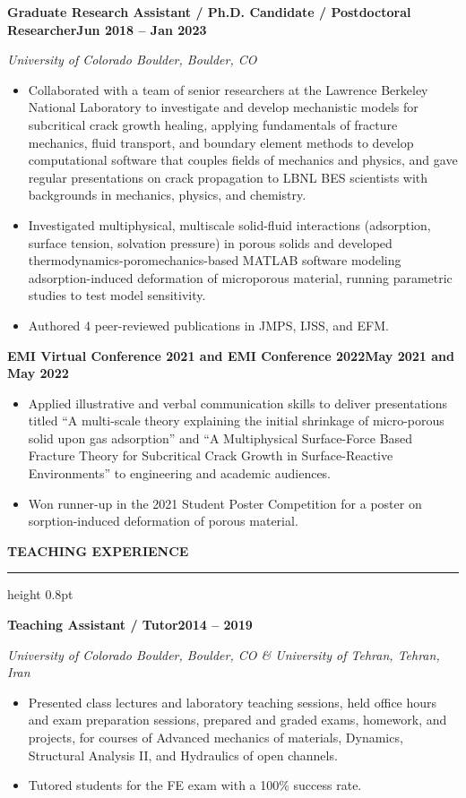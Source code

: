 \documentclass[10pt, letterpaper]{article}
\newcommand{\rsection}[1]{%
  \vspace{8pt}%
  {\large\bfseries\MakeUppercase{#1}}%
  \vspace{1pt}%
  \hrule height 0.8pt%
  \vspace{4pt}%
}
\newcommand{\jobline}[2]{%
  \vspace{5pt}%
  \noindent\textbf{#1}\hfill\textbf{#2}\par%
  \vspace{1pt}%
}
\newcommand{\subline}[1]{%
  \vspace{-1pt}%
  \noindent\textit{#1}\par%
  \vspace{1pt}%
}
\newenvironment{rlist}{%
  \begin{itemize}[leftmargin=1.4em, itemsep=1pt, topsep=2pt, parsep=0pt]%
}{%
  \end{itemize}%
}
\begin{document}
\jobline{Graduate Research Assistant / Ph.D. Candidate / Postdoctoral Researcher}{Jun 2018 -- Jan 2023}
\subline{University of Colorado Boulder, Boulder, CO}
\begin{rlist}
  \item Collaborated with a team of senior researchers at the Lawrence Berkeley National Laboratory to investigate and develop mechanistic models for subcritical crack growth healing, applying fundamentals of fracture mechanics, fluid transport, and boundary element methods to develop computational software that couples fields of mechanics and physics, and gave regular presentations on crack propagation to LBNL BES scientists with backgrounds in mechanics, physics, and chemistry.
  \item Investigated multiphysical, multiscale solid-fluid interactions (adsorption, surface tension, solvation pressure) in porous solids and developed thermodynamics-poromechanics-based MATLAB software modeling adsorption-induced deformation of microporous material, running parametric studies to test model sensitivity.
  \item Authored 4 peer-reviewed publications in JMPS, IJSS, and EFM.
\end{rlist}

\jobline{EMI Virtual Conference 2021 and EMI Conference 2022}{May 2021 and May 2022}
\begin{rlist}
  \item Applied illustrative and verbal communication skills to deliver presentations titled ``A multi-scale theory explaining the initial shrinkage of micro-porous solid upon gas adsorption'' and ``A Multiphysical Surface-Force Based Fracture Theory for Subcritical Crack Growth in Surface-Reactive Environments'' to engineering and academic audiences.
  \item Won runner-up in the 2021 Student Poster Competition for a poster on sorption-induced deformation of porous material.
\end{rlist}


\rsection{Teaching Experience}

\jobline{Teaching Assistant / Tutor}{2014 -- 2019}
\subline{University of Colorado Boulder, Boulder, CO \& University of Tehran, Tehran, Iran}
\begin{rlist}
  \item Presented class lectures and laboratory teaching sessions, held office hours and exam preparation sessions, prepared and graded exams, homework, and projects, for courses of Advanced mechanics of materials, Dynamics, Structural Analysis II, and Hydraulics of open channels.
  \item Tutored students for the FE exam with a 100\% success rate.
\end{rlist}
\end{document}
